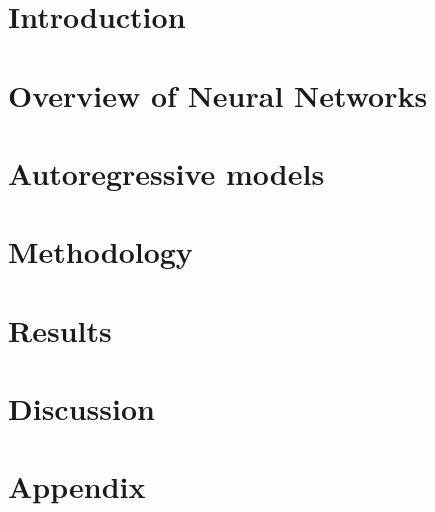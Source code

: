 \documentclass{thesis}
\begin{document}
\maketitle





\thesisTables
\thesisBodyStart

\chapter{Introduction}


\chapter{Overview of Neural Networks}


\chapter{Autoregressive models}


\chapter{Methodology}


\chapter{Results}


\chapter{Discussion}


\printReferences
\thesisTOT
\thesisTOF

\chapter{Appendix}

\end{document}
